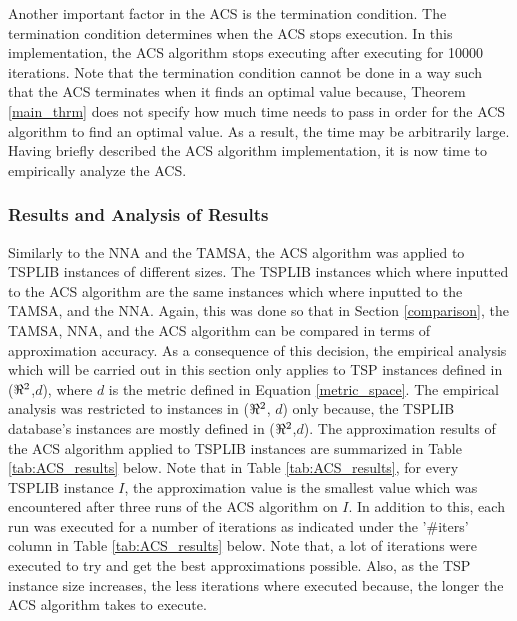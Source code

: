\documentclass{article}
\begin{document}
Another important factor in the ACS is the termination condition. The termination condition determines when the ACS stops execution. In this implementation, the ACS algorithm stops executing after executing for 10000 iterations. Note that the termination condition cannot be done in a way such that the ACS terminates when it finds an optimal value because, Theorem \ref{main_thrm} does not specify how much time needs to pass in order for the ACS algorithm to find an optimal value. As a result, the time may be arbitrarily large. Having briefly described the ACS algorithm implementation, it is now time to empirically analyze the ACS.
\subsubsection{Results and Analysis of Results}
\label{acs_analysis}
Similarly to the NNA and the TAMSA, the ACS algorithm was applied to TSPLIB instances of different sizes. The TSPLIB instances which where inputted to the ACS algorithm are the same instances which where inputted to the TAMSA, and the NNA. Again, this was done so that in Section \ref{comparison}, the TAMSA, NNA, and the ACS algorithm can be compared in terms of approximation accuracy. As a consequence of this decision, the empirical analysis which will be carried out in this section only applies to TSP instances defined in ($\real^2$,$d$), where $d$ is the metric defined in Equation \ref{metric_space}. The empirical analysis was restricted to instances in ($\real^2$, $d$) only because, the TSPLIB database's instances are mostly defined in ($\real^2$,$d$). The approximation results of the ACS algorithm applied to TSPLIB instances are summarized in Table \ref{tab:ACS_results} below. Note that in Table \ref{tab:ACS_results}, for every TSPLIB instance $I$, the approximation value is the smallest value which was encountered after three runs of the ACS algorithm on $I$. In addition to this, each run was executed for a number of iterations as indicated under the '\#iters' column in Table \ref{tab:ACS_results} below. Note that, a lot of iterations were executed to try and get the best approximations possible. Also, as the TSP instance size increases, the less iterations where executed because, the longer the ACS algorithm takes to execute.
\end{document}
